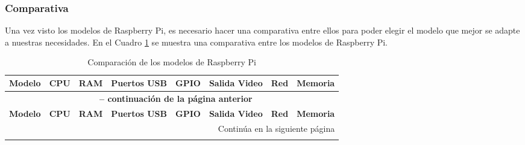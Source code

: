 \subsubsection{Comparativa}
\label{ssub:comparativa}
    Una vez visto los modelos de Raspberry Pi, es necesario hacer una comparativa entre ellos para poder
        elegir el modelo que mejor se adapte a nuestras necesidades. En el Cuadro \ref{tab:comparacion01} se muestra
        una comparativa entre los modelos de Raspberry Pi.
    
    {\small %
        \begin{longtable}{|p{1.8cm}|p{2.8cm}|p{1.2cm}|p{1.5cm}|p{1.5cm}|p{2.0cm}|p{2.0cm}|p{2.0cm}|}
        \caption{Comparaci\'on de los modelos de Raspberry Pi} \label{tab:comparacion01} \\
        \hline
        \textbf{Modelo} & \textbf{CPU} & \textbf{RAM} & \textbf{Puertos USB} & \textbf{GPIO} & \textbf{Salida Video} & \textbf{Red} & \textbf{Memoria} \\ \hline
        \endfirsthead

        \multicolumn{8}{c}{{\bfseries \tablename\ \thetable{} -- continuaci\'on de la p\'agina anterior}} \\
        \hline
        \textbf{Modelo} & \textbf{CPU} & \textbf{RAM} & \textbf{Puertos USB} & \textbf{GPIO} & \textbf{Salida Video} & \textbf{Red} & \textbf{Memoria} \\ \hline
        \endhead

        \hline \multicolumn{8}{|r|}{{Contin\'ua en la siguiente p\'agina}} \\ \hline
        \endfoot


\end{longtable}}
